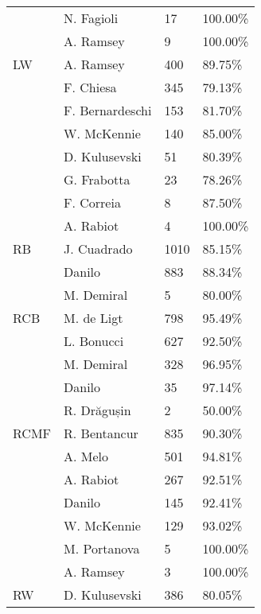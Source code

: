 \begin{table}[!htbp]
\begin{tabular}{@{}llll@{}}
            & N. Fagioli        & 17          & 100.00\% \\
           & A. Ramsey         & 9           & 100.00\% \\
LW               & A. Ramsey         & 400         & 89.75\%  \\
            & F. Chiesa         & 345         & 79.13\%  \\
            & F. Bernardeschi   & 153         & 81.70\%  \\
             & W. McKennie       & 140         & 85.00\%  \\
             & D. Kulusevski     & 51          & 80.39\%  \\
             & G. Frabotta       & 23          & 78.26\%  \\
              & F. Correia     & 8           & 87.50\%  \\
           & A. Rabiot         & 4           & 100.00\% \\
RB               & J. Cuadrado       & 1010        & 85.15\%  \\
             & Danilo            & 883         & 88.34\%  \\
             & M. Demiral        & 5           & 80.00\%  \\
RCB              & M. de Ligt        & 798         & 95.49\%  \\
              & L. Bonucci        & 627         & 92.50\%  \\
              & M. Demiral        & 328         & 96.95\%  \\
              & Danilo          & 35          & 97.14\%  \\
              & R. Drăgușin       & 2           & 50.00\%  \\
RCMF             & R. Bentancur      & 835         & 90.30\%  \\
             & A. Melo            & 501         & 94.81\%  \\
             & A. Rabiot         & 267         & 92.51\%  \\
             & Danilo            & 145         & 92.41\%  \\
             & W. McKennie       & 129         & 93.02\%  \\
             & M. Portanova      & 5           & 100.00\% \\
             & A. Ramsey         & 3           & 100.00\% \\
RW               & D. Kulusevski     & 386         & 80.05\%  \\

\end{tabular}
\end{table}
